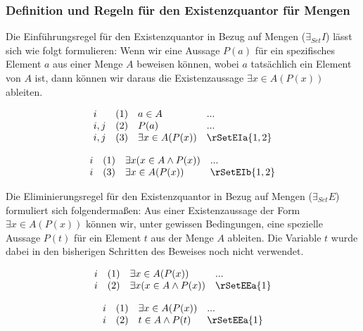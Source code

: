 \documentclass{book}
\theoremstyle{plain}
\theoremstyle{remark}
\theoremstyle{definition}
\begin{document}
\subsubsection{Definition und Regeln für den Existenzquantor für Mengen}
\label{rule:rSetEI} \label{rule:rSetEE}

Die Einführungsregel für den Existenzquantor in Bezug auf Mengen (\(\exists_{Set} I\)) lässt sich wie folgt formulieren:
Wenn wir eine Aussage \(P(a)\) für ein spezifisches Element \(a\) aus einer Menge \(A\) beweisen können, wobei \(a\) tatsächlich ein Element von \(A\) ist, dann können wir daraus die Existenzaussage \(\exists x \in A(P(x))\) ableiten.

\[
\begin{array}{llll}
	i & (1) & a\in A & ... \\
	i,j & (2) & P(a) & ... \\
	i,j & (3) & \exists x \in A(P(x)) & \rSetEIa{1,2} \\
\end{array}
\]

\[
\begin{array}{llll}
	i & (1) & \exists x(x\in A\land P(x)) & ... \\
	i & (3) & \exists x \in A(P(x)) & \rSetEIb{1,2} \\
\end{array}
\]

Die Eliminierungsregel für den Existenzquantor in Bezug auf Mengen (\(\exists_{Set} E\)) formuliert sich folgendermaßen:
Aus einer Existenzaussage der Form \(\exists x \in A(P(x))\) können wir, unter gewissen Bedingungen, eine spezielle Aussage \(P(t)\) für ein Element \(t\) aus der Menge \(A\) ableiten. Die Variable \(t\) wurde dabei in den bisherigen Schritten des Beweises noch nicht verwendet.

\[
\begin{array}{llll}
	i & (1) & \exists x \in A(P(x)) & ... \\
	i & (2) & \exists x(x\in A\land P(x)) & \rSetEEa{1} \\
\end{array}
\]

\[
\begin{array}{llll}
	i & (1) & \exists x \in A(P(x)) & ... \\
	i & (2) & t\in A\land P(t) & \rSetEEa{1} \\
\end{array}
\]
\end{document}
